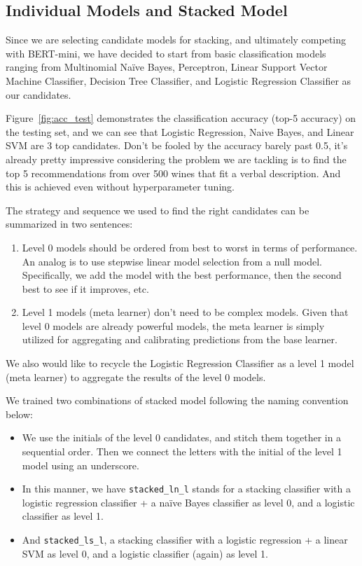 \documentclass[
	a4paper,
	fontsize=10pt, %
	twoside=false, %
	secnumdepth=2, %
]{kaohandt}
\begin{document}
\subsection{Individual Models and Stacked Model}

Since we are selecting candidate models for stacking, and ultimately competing with BERT-mini, we have decided to start from basic classification models ranging from Multinomial Naïve Bayes, Perceptron, Linear Support Vector Machine Classifier, Decision Tree Classifier, and Logistic Regression Classifier as our candidates.

Figure~\ref{fig:acc_test} demonstrates the classification accuracy (top-5 accuracy) on the testing set, and we can see that Logistic Regression, Naive Bayes, and Linear SVM are 3 top candidates. Don’t be fooled by the accuracy barely past 0.5, it’s already pretty impressive considering the problem we are tackling is to find the top 5 recommendations from over 500 wines that fit a verbal description. And this is achieved even without hyperparameter tuning.

The strategy and sequence we used to find the right candidates can be summarized in two sentences:

\begin{enumerate}
	\item Level 0 models should be ordered from best to worst in terms of performance. An analog is to use stepwise linear model selection from a null model. Specifically, we add the model with the best performance, then the second best to see if it improves, etc.
	\item Level 1 models (meta learner) don’t need to be complex models. Given that level 0 models are already powerful models, the meta learner is simply utilized for aggregating and calibrating predictions from the base learner.
\end{enumerate}

We also would like to recycle the Logistic Regression Classifier as a level 1 model (meta learner) to aggregate the results of the level 0 models.

We trained two combinations of stacked model following the naming convention below:

\begin{itemize}
	\item We use the initials of the level 0 candidates, and stitch them together in a sequential order. Then we connect the letters with the initial of the level 1 model using an underscore.
	\item In this manner, we have \texttt{stacked\_ln\_l} stands for a stacking classifier with a logistic regression classifier + a naïve Bayes classifier as level 0, and a logistic classifier as level 1.
	\item And \texttt{stacked\_ls\_l}, a stacking classifier with a logistic regression + a linear SVM as level 0, and a logistic classifier (again) as level 1.
\end{itemize}
\end{document}

